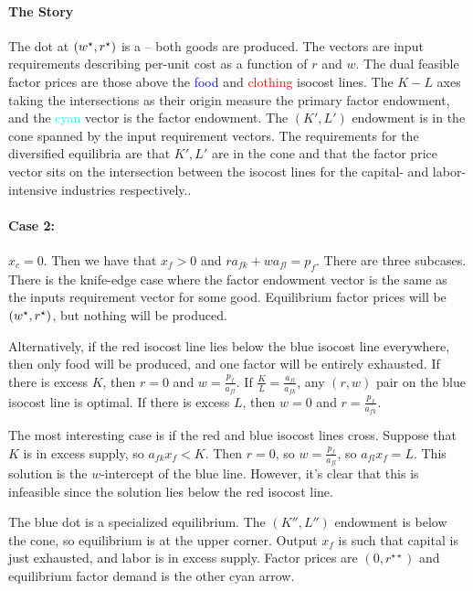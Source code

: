 \documentclass[10pt]{article}
\begin{document}
\paragraph{The Story}
	The dot at $(w^\star,r^\star)$ is a  -- both goods are produced. The vectors are input requirements describing per-unit cost as a function of $r$ and $w$. The dual feasible factor prices are those above the \textcolor{blue}{food} and \textcolor{red}{clothing} isocost lines. The $K-L$ axes taking the intersections as their origin measure the primary factor endowment, and the \textcolor{cyan}{cyan} vector is the factor endowment. The $(K',L')$ endowment is in the cone spanned by the input requirement vectors. The requirements for the diversified equilibria are that $K',L'$ are in the cone and that the factor price vector sits on the intersection between the isocost lines for the capital- and labor-intensive industries respectively..


\paragraph{Case 2:} $x_c = 0$. Then we have that $x_f > 0$ and $ra_{fk}+wa_{fl}=p_f$. There are three subcases. There is the knife-edge case where the factor endowment vector is the same as the inputs requirement vector for some good. Equilibrium factor prices will be $(w^\star,r^\star)$, but nothing will be produced.

Alternatively, if the red isocost line lies below the blue isocost line everywhere, then only food will be produced, and one factor will be entirely exhausted. If there is excess $K$, then $r = 0$ and $w = \frac{p_f}{a_{fl}}$. If $\frac{K}{L} = \frac{a_{fl}}{a_{fk}}$, any $(r,w)$ pair on the blue isocost line is optimal. If there is excess $L$, then $w = 0$ and $r = \frac{p_f}{a_{fk}}$.

The most interesting case is if the red and blue isocost lines cross. Suppose that $K$ is in excess supply, so $a_{fk}x_f < K$. Then $r = 0$, so $w = \frac{p_f}{a_{fl}}$, so $a_{fl}x_f = L$. This solution is the $w$-intercept of the blue line. However, it's clear that this is infeasible since the solution lies below the red isocost line.

\begin{remark}
	The blue dot is a specialized equilibrium. The $(K'',L'')$ endowment is below the cone, so equilibrium is at the upper corner. Output $x_f$ is such that capital is just exhausted, and labor is in excess supply. Factor prices are $(0,r^{\star\star})$ and equilibrium factor demand is the other cyan arrow. 
\end{remark}
\end{document}
